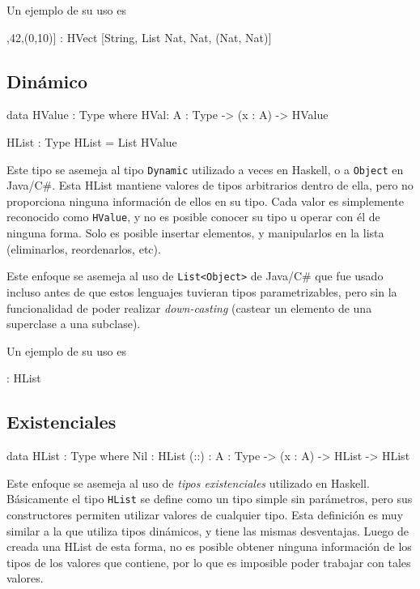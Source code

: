 Un ejemplo de su uso es 

\begin{code}
["Hello",[1,2,3],42,(0,10)] : 
HVect [String, List Nat, Nat, (Nat, Nat)]
\end{code}

\subsection{Dinámico}

\begin{code}
data HValue : Type where
	HVal: {A : Type} -> (x : A) -> HValue

HList : Type
HList = List HValue 
\end{code}

Este tipo se asemeja al tipo \texttt{Dynamic} utilizado a veces en Haskell, o a \texttt{Object} en Java/C\#. Esta HList mantiene valores de tipos arbitrarios dentro de ella, pero no proporciona ninguna información de ellos en su tipo. Cada valor es simplemente reconocido como \texttt{HValue}, y no es posible conocer su tipo u operar con él de ninguna forma. Solo es posible insertar elementos, y manipularlos en la lista (eliminarlos, reordenarlos, etc).

Este enfoque se asemeja al uso de \texttt{List<Object>} de Java/C\# que fue usado incluso antes de que estos lenguajes tuvieran tipos parametrizables, pero sin la funcionalidad de poder realizar \textit{down-casting} (castear un elemento de una superclase a una subclase).

Un ejemplo de su uso es 

\begin{code}
 : HList
\end{code}

\subsection{Existenciales}

\begin{code}
data HList : Type where
    Nil : HList
    (::) : {A : Type} -> (x : A) -> HList -> HList
\end{code}

Este enfoque se asemeja al uso de \textit{tipos existenciales} utilizado en Haskell. Básicamente el tipo \texttt{HList} se define como un tipo simple sin parámetros, pero sus constructores permiten utilizar valores de cualquier tipo.
Esta definición es muy similar a la que utiliza tipos dinámicos, y tiene las mismas desventajas. Luego de creada una HList de esta forma, no es posible obtener ninguna información de los tipos de los valores que contiene, por lo que es imposible poder trabajar con tales valores.

